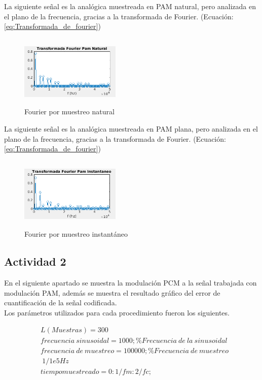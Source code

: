 La siguiente señal es la analógica muestreada en PAM natural, pero analizada en el plano de la frecuencia, gracias a la transformada de Fourier. (Ecuación:\ref{eq:Transformada_de_fourier})

\begin{figure}[H]
    \centering
        \includegraphics[height=130px, width=180px]{Imagenes/Actividad1/TFnatu.png}
    \caption{Fourier por muestreo natural}
    \label{fig:Fourier_por_muestre_natural}
\end{figure}

La siguiente señal es la analógica muestreada en PAM plana, pero analizada en el plano de la frecuencia, gracias a la transformada de Fourier. (Ecuación:\ref{eq:Transformada_de_fourier})
\begin{figure}[H]
    \centering
    \includegraphics[height=130px, width=180px]{Imagenes/Actividad1/TFplana.png}
    \caption{Fourier por muestreo instantáneo}
    \label{fig:Fourier_por_muestre_natural}
\end{figure}



\subsection{Actividad 2}

En el siguiente apartado se muestra la modulación PCM a la señal trabajada con modulación PAM, además se muestra el resultado gráfico del error de cuantificación de la señal codificada.\\

Los parámetros utilizados para cada procedimiento fueron los siguientes.

\begin{equation} \label{eq:muestras_frecuencia_sinusoidal_muestreo_muestreado}
\begin{split} 
&L(Muestras) = 300 \\
&frecuencia\ sinusoidal=1000; \%Frecuencia\ de\ la\ sinusoidal \\
&frecuencia\ de\ muestreo=100000; \%Frecuencia\ de\ muestreo \\
&\ 1/1e5Hz \\
&tiempo muestreado=0:1/fm:2/fc;
\end{split} 
\end{equation}

